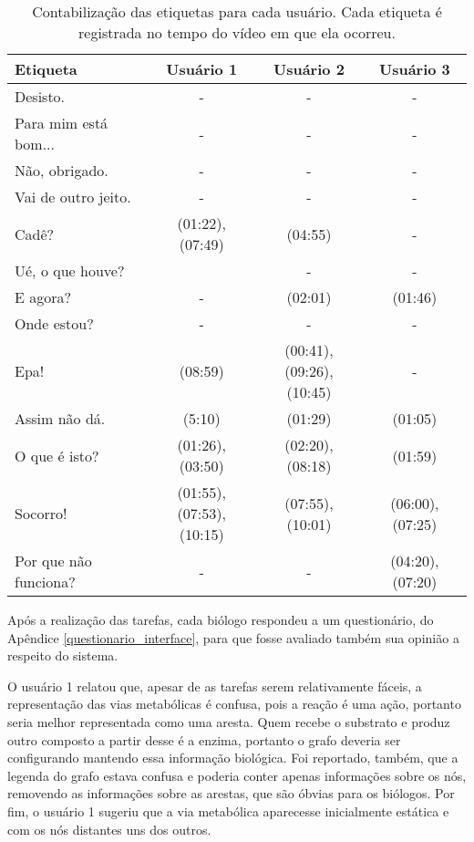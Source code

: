 \begin{table}[h!]
  \centering
  \caption{Contabilização das etiquetas para cada usuário. Cada etiqueta é registrada no tempo do vídeo em que ela ocorreu.}
  \label{tabela_de_etiquetas}
  \begin{tabular}{|l|c|c|c|}
  \hline
  {\cellcolor[HTML]{DFDFDF}Etiqueta} & {\cellcolor[HTML]{DFDFDF}Usuário 1} & {\cellcolor[HTML]{DFDFDF}Usuário 2} & {\cellcolor[HTML]{DFDFDF}Usuário 3} \\ \hline
  Desisto. & - & - & - \\ \hline
  Para mim está bom... & - & - & - \\ \hline
  Não, obrigado. & - & - & - \\ \hline
  Vai de outro jeito. & - & - & - \\ \hline
  Cadê? & (01:22), (07:49) & (04:55) & - \\ \hline
  Ué, o que houve? &  & - & - \\ \hline
  E agora? & - & (02:01) & (01:46) \\ \hline
  Onde estou? & - & - & - \\ \hline
  Epa! & (08:59) & \specialcell{(00:41), (09:26),\\(10:45)} & - \\ \hline
  Assim não dá. & (5:10) & (01:29) & (01:05) \\ \hline
  O que é isto? & (01:26), (03:50) & (02:20), (08:18) & (01:59) \\ \hline
  Socorro! & \specialcell{(01:55), (07:53),\\(10:15)} & (07:55), (10:01) & (06:00), (07:25) \\ \hline
  Por que não funciona? & - & - & (04:20), (07:20) \\ \hline
  \end{tabular}
\end{table}

\indent Após a realização das tarefas, cada biólogo respondeu a um questionário, do Apêndice \ref{questionario_interface}, para que fosse avaliado também sua opinião a respeito do sistema.

\indent O usuário 1 relatou que, apesar de as tarefas serem relativamente fáceis, a representação das vias metabólicas é confusa, pois a reação é uma ação, portanto seria melhor representada como uma aresta. Quem recebe o substrato e produz outro composto a partir desse é a enzima, portanto o grafo deveria ser configurando mantendo essa informação biológica. Foi reportado, também, que a legenda do grafo estava confusa e poderia conter apenas informações sobre os nós, removendo as informações sobre as arestas, que são óbvias para os biólogos. Por fim, o usuário 1 sugeriu que a via metabólica aparecesse inicialmente estática e com os nós distantes uns dos outros.

